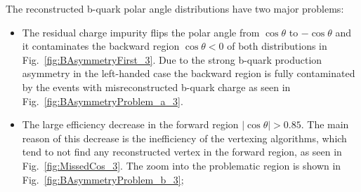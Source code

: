 The reconstructed b-quark polar angle distributions have two major problems:
\begin{itemize}
	\item The residual charge impurity flips the polar angle from $\cos\theta$ to $-\cos\theta$ and it contaminates the backward region $\cos\theta < 0$ of both distributions in Fig.~\ref{fig:BAsymmetryFirst_3}. Due to the strong b-quark production asymmetry in the left-handed case the backward region is fully contaminated by the events with misreconstructed b-quark charge as seen in Fig.~\ref{fig:BAsymmetryProblem_a_3}.
	\item The large efficiency decrease in the forward region $|\cos\theta| > 0.85$. The main reason of this decrease is the inefficiency of the vertexing algorithms, which tend to not find any reconstructed vertex in the forward region, as seen in Fig.~\ref{fig:MissedCos_3}. The zoom into the problematic region is shown in Fig.~\ref{fig:BAsymmetryProblem_b_3};

\end{itemize}


